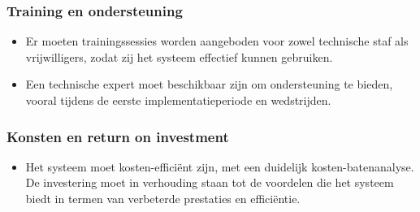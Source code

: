 \subsubsection{Training en ondersteuning}
\begin{itemize}
  \item Er moeten trainingssessies worden aangeboden voor zowel technische staf als vrijwilligers, zodat zij het systeem effectief kunnen gebruiken.
  \item Een technische expert moet beschikbaar zijn om ondersteuning te bieden, vooral tijdens de eerste implementatieperiode en wedstrijden.
\end{itemize}

\subsubsection{Konsten en return on investment}
\begin{itemize}
  \item Het systeem moet kosten-efficiënt zijn, met een duidelijk kosten-batenanalyse. De investering moet in verhouding staan tot de voordelen die het systeem biedt in termen van verbeterde prestaties en efficiëntie.
\end{itemize}
